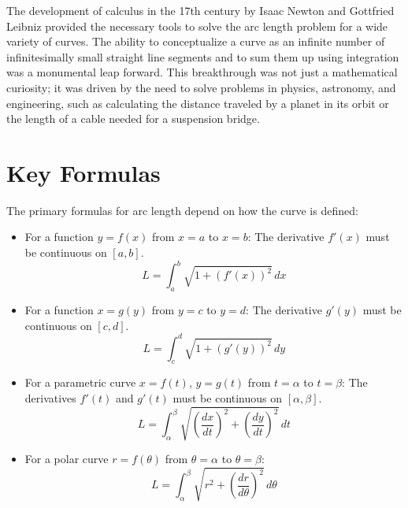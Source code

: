 \documentclass{article}
\begin{document}
The development of calculus in the 17th century by Isaac Newton and Gottfried Leibniz provided the necessary tools to solve the arc length problem for a wide variety of curves. The ability to conceptualize a curve as an infinite number of infinitesimally small straight line segments and to sum them up using integration was a monumental leap forward. This breakthrough was not just a mathematical curiosity; it was driven by the need to solve problems in physics, astronomy, and engineering, such as calculating the distance traveled by a planet in its orbit or the length of a cable needed for a suspension bridge.

\section*{Key Formulas}
The primary formulas for arc length depend on how the curve is defined:
\begin{itemize}
    \item For a function $y = f(x)$ from $x = a$ to $x = b$: The derivative $f'(x)$ must be continuous on $[a, b]$.
    \[ L = \int_{a}^{b} \sqrt{1 + (f'(x))^2} \,dx \]
    \item For a function $x = g(y)$ from $y = c$ to $y = d$: The derivative $g'(y)$ must be continuous on $[c, d]$.
    \[ L = \int_{c}^{d} \sqrt{1 + (g'(y))^2} \,dy \]
    \item For a parametric curve $x = f(t)$, $y = g(t)$ from $t = \alpha$ to $t = \beta$: The derivatives $f'(t)$ and $g'(t)$ must be continuous on $[\alpha, \beta]$.
    \[ L = \int_{\alpha}^{\beta} \sqrt{(\frac{dx}{dt})^2 + (\frac{dy}{dt})^2} \,dt \]
    \item For a polar curve $r = f(\theta)$ from $\theta = \alpha$ to $\theta = \beta$:
    \[ L = \int_{\alpha}^{\beta} \sqrt{r^2 + (\frac{dr}{d\theta})^2} \,d\theta \]
\end{itemize}
\end{document}
